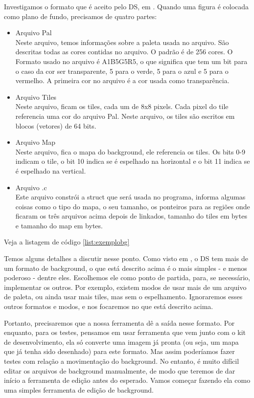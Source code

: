 \documentclass[brazil]{abnt}
\begin{document}
Investigamos o formato que é aceito pelo DS, em \cite{DSSpec}. Quando uma figura é colocada como plano de fundo, precisamos de quatro partes:

\begin{itemize}
 \item Arquivo Pal\\
 Neste arquivo, temos informações sobre a paleta usada no arquivo. São descritas todas as cores contidas no arquivo. O padrão é de 256 cores. O Formato usado no arquivo é A1B5G5R5, o que significa que tem um bit para o caso da cor ser transparente, 5 para o verde, 5 para o azul e 5 para o vermelho. A primeira cor no arquivo é a cor usada como transparência.
 \item Arquivo Tiles\\
 Neste arquivo, ficam os tiles, cada um de 8x8 pixels. Cada pixel do tile referencia uma cor do arquivo Pal. Neste arquivo, os tiles são escritos em blocos (vetores) de 64 bits. 
 \item Arquivo Map\\
 Neste arquivo, fica o mapa do background, ele referencia os tiles. Os bits 0-9 indicam o tile, o bit 10 indica se é espelhado na horizontal e o bit 11 indica se é espelhado na vertical.
 \item Arquivo .c\\
 Este arquivo constrói a struct que será usada no programa, informa algumas coisas como o tipo do mapa, o seu tamanho, os ponteiros para as regiões onde ficaram os três arquivos acima depois de linkados, tamanho do tiles em bytes e tamanho do map em bytes. 
\end{itemize}

Veja a listagem de código \ref{list:exemplobg}

Temos alguns detalhes a discutir nesse ponto. Como visto em \cite{DSSpec}, o DS tem mais de um formato de background, o que está descrito acima é o mais simples - e menos poderoso - dentre eles. Escolhemos ele como ponto de partida, para, se necessário, implementar os outros. Por exemplo, existem modos de usar mais de um arquivo de paleta, ou ainda usar mais tiles, mas sem o espelhamento. Ignoraremos esses outros formatos e modos, e nos focaremos no que está descrito acima.

Portanto, precisaremos que a nossa ferramenta dê a saída nesse formato. Por enquanto, para os testes, pensamos em usar ferramenta que vem junto com o kit de desenvolvimento, ela só converte uma imagem já pronta (ou seja, um mapa que já tenha sido desenhado) para este formato. Mas assim poderíamos fazer testes com relação a movimentação do background. No entanto, é muito difícil editar os arquivos de background manualmente, de modo que teremos de dar início a ferramenta de edição antes do esperado. Vamos começar fazendo ela como uma simples ferramenta de edição de background.
\end{document}
